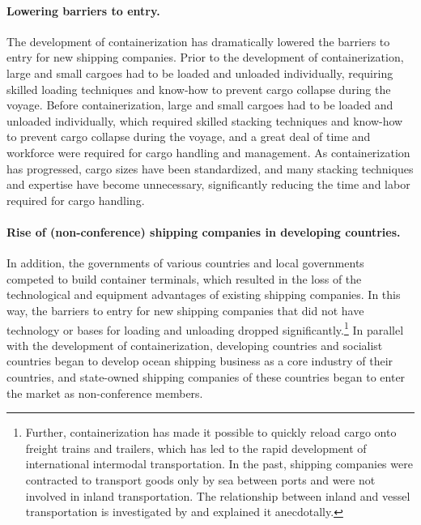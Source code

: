 \documentclass[11pt]{article}
\begin{document}
\paragraph{Lowering barriers to entry.}
The development of containerization has dramatically lowered the barriers to entry for new shipping companies. Prior to the development of containerization, large and small cargoes had to be loaded and unloaded individually, requiring skilled loading techniques and know-how to prevent cargo collapse during the voyage. Before containerization, large and small cargoes had to be loaded and unloaded individually, which required skilled stacking techniques and know-how to prevent cargo collapse during the voyage, and a great deal of time and workforce were required for cargo handling and management. As containerization has progressed, cargo sizes have been standardized, and many stacking techniques and expertise have become unnecessary, significantly reducing the time and labor required for cargo handling.

\paragraph{Rise of (non-conference) shipping companies in developing countries.}
In addition, the governments of various countries and local governments competed to build container terminals, which resulted in the loss of the technological and equipment advantages of existing shipping companies. In this way, the barriers to entry for new shipping companies that did not have technology or bases for loading and unloading dropped significantly.\footnote{Further, containerization has made it possible to quickly reload cargo onto freight trains and trailers, which has led to the rapid development of international intermodal transportation. In the past, shipping companies were contracted to transport goods only by sea between ports and were not involved in inland transportation. The relationship between inland and vessel transportation is investigated by \cite{bernhofen2016estimating} and \cite{levinson2016box} explained it anecdotally. } In parallel with the development of containerization, developing countries and socialist countries began to develop ocean shipping business as a core industry of their countries, and state-owned shipping companies of these countries began to enter the market as non-conference members.
\end{document}
